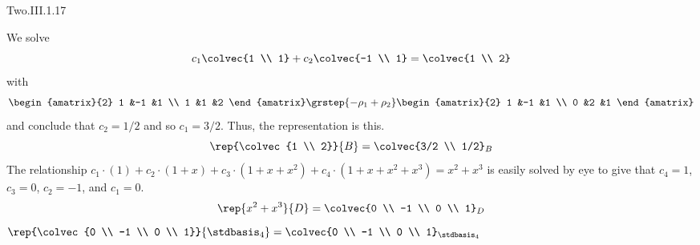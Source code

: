 \begin{ans}{Two.III.1.17}
      \begin{exparts}
        \partsitem We solve
          \begin{equation*}
            c_1\colvec{1 \\ 1}
            +c_2\colvec{-1 \\ 1}
            =\colvec{1 \\ 2}
          \end{equation*}
          with
          \begin{equation*}
             \begin{amatrix}{2}
               1  &-1  &1  \\
               1  &1   &2
             \end{amatrix}
             \grstep{-\rho_1+\rho_2}
             \begin{amatrix}{2}
               1  &-1  &1  \\
               0  &2   &1
             \end{amatrix}
          \end{equation*}
          and conclude that \( c_2=1/2 \) and so \( c_1=3/2 \).
          Thus, the representation is this.
          \begin{equation*}
            \rep{\colvec{1 \\ 2}}{B}=\colvec{3/2 \\ 1/2}_B
          \end{equation*}
        \partsitem The relationship
           $c_1\cdot(1)+c_2\cdot(1+x)+c_3\cdot(1+x+x^2)+c_4\cdot(1+x+x^2+x^3)
             =x^2+x^3$
           is easily solved by eye to give that $c_4=1$, $c_3=0$, $c_2=-1$, and
           $c_1=0$.
           \begin{equation*}
              \rep{x^2+x^3}{D}=\colvec{0 \\ -1 \\ 0 \\ 1}_D
           \end{equation*}
        \partsitem \( \rep{\colvec{0 \\ -1 \\ 0 \\ 1}}{\stdbasis_4}
                     =\colvec{0 \\ -1 \\ 0 \\ 1}_{\stdbasis_4} \)
      \end{exparts}
    
\end{ans}
